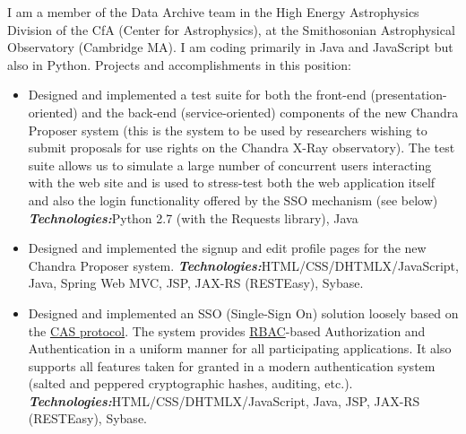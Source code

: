 \documentclass[helvetica,english,logo,notitle,totpages,utf8]{europecv2013}
\newcommand{\technologies}[0]{\textbf{\textit{Technologies:}}}
\begin{document}

\begin{europecv}
\ecvpersonalinfo[10pt]






                  {I am a member of the Data Archive team in the High Energy Astrophysics Division of the CfA (Center for Astrophysics),
    at the Smithosonian Astrophysical Observatory (Cambridge MA). I am coding primarily in Java and JavaScript but also in Python.
    Projects and accomplishments in this position:
    \begin{itemize}
      \item Designed and implemented a test suite for both the front-end (presentation-oriented) and the back-end (service-oriented)
    components of the new Chandra Proposer system (this is the system to be used by researchers wishing to submit proposals for
    use rights on the Chandra X-Ray observatory). The test suite allows us to simulate a large number of concurrent users
    interacting with the web site and is used to stress-test both the web application itself and also the login functionality
    offered by the SSO mechanism
    (see below)
    \technologies Python 2.7 (with the Requests library), Java
  \item Designed and implemented the signup and edit profile pages for the new Chandra Proposer system.
      \technologies HTML/CSS/DHTMLX/JavaScript, Java, Spring Web MVC, JSP, JAX-RS (RESTEasy), Sybase.    
  \item Designed and implemented an SSO (Single-Sign On) solution loosely based on the
    \href{https://en.wikipedia.org/wiki/Central_Authentication_Service}{CAS protocol}. The system provides
    \href{https://en.wikipedia.org/wiki/Role-based_access_control}{RBAC}-based Authorization
    and Authentication in a uniform manner for all participating applications. It also supports all features
    taken for granted in a modern authentication system (salted and peppered cryptographic hashes, auditing, etc.).
      \technologies HTML/CSS/DHTMLX/JavaScript, Java, JSP, JAX-RS (RESTEasy), Sybase.

\end{itemize}}
\end{europecv}
\end{document}
